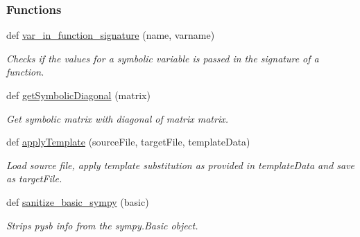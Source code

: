 \subsubsection*{Functions}
\begin{DoxyCompactItemize}
\item 
def \mbox{\hyperlink{namespaceamici_1_1ode__export_a365aaf8b78bb2db9c94b1a8087d60a16}{var\+\_\+in\+\_\+function\+\_\+signature}} (name, varname)
\begin{DoxyCompactList}\small\item\em Checks if the values for a symbolic variable is passed in the signature of a function. \end{DoxyCompactList}\item 
def \mbox{\hyperlink{namespaceamici_1_1ode__export_aed240175cce2aa528fe24d1486c52559}{get\+Symbolic\+Diagonal}} (matrix)
\begin{DoxyCompactList}\small\item\em Get symbolic matrix with diagonal of matrix {\ttfamily matrix}. \end{DoxyCompactList}\item 
def \mbox{\hyperlink{namespaceamici_1_1ode__export_af4b013340d08cdef3247601d2bf0b62f}{apply\+Template}} (source\+File, target\+File, template\+Data)
\begin{DoxyCompactList}\small\item\em Load source file, apply template substitution as provided in template\+Data and save as target\+File. \end{DoxyCompactList}\item 
def \mbox{\hyperlink{namespaceamici_1_1ode__export_af0bfa7839b41792994b1add20b86cf8e}{sanitize\+\_\+basic\+\_\+sympy}} (basic)
\begin{DoxyCompactList}\small\item\em Strips pysb info from the sympy.\+Basic object. \end{DoxyCompactList}\end{DoxyCompactItemize}
